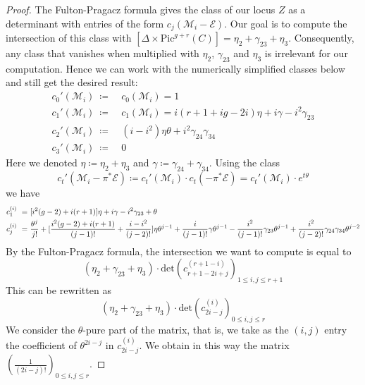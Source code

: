 \documentclass{article}
\theoremstyle{plain}
\theoremstyle{definition}
\def\cM{\mathcal{M}}
\begin{document}
\begin{proof}
The Fulton-Pragacz formula gives the class of our locus $Z$ as a determinant with entries of the form $c_j(\cM_i - \mathcal{E})$. Our goal is to compute the intersection of this class with $[\Delta\times \mathrm{Pic}^{g+r}(C)] = \eta_2 + \gamma_{23} +\eta_3$. Consequently, any class that vanishes when multiplied with $\eta_2$, $\gamma_{23}$ and $\eta_3$ is irrelevant for our computation. Hence we can work with the numerically simplified classes below and still get the desired result: 
\begin{align*}
	c_0'(\cM_i) \ \coloneqq & \ c_0(\cM_i) = 1 \\ 
	c_1'(\cM_i) \ \coloneqq & \ c_1(\cM_i) = i(r+1+ig-2i) \eta +i\gamma - i^2 \gamma_{23} \\
	c_2'(\cM_i) \ \coloneqq & \ (i-i^2)\eta\theta + i^2 \gamma_{24}\gamma_{34} \\ 
	c_3'(\cM_i) \ \coloneqq & \ 0
\end{align*} 
Here we denoted $\eta \coloneqq \eta_2 + \eta_3 $ and $\gamma \coloneqq \gamma_{24} + \gamma_{34}$. Using the class \[c_t'(\cM_i-\pi^*\mathcal{E}) \coloneqq c_t'(\cM_i) \cdot c_t(-\pi^*\mathcal{E}) = c_t'(\cM_i)\cdot e^{t\theta}\]
we have 
\begin{align*}
	c_1^{(i)} \ =& \ \text{\Large [}i^2(g-2) + i(r+1)\text{\Large ]}\eta + i\gamma - i^2\gamma_{23} + \theta \\ 
	c_j^{(i)} \ = & \ \frac{\theta^j}{j!} + \text{\LARGE [} \frac{i^2(g-2) + i(r+1)}{(j-1)!} + \frac{i-i^2}{(j-2)!} \text{\LARGE ]}\eta\theta^{j-1} + \frac{i}{(j-1)!}\gamma\theta^{j-1} - \frac{i^2}{(j-1)!}\gamma_{23}\theta^{j-1} + \frac{i^2}{(j-2)!}\gamma_{24}\gamma_{34}\theta^{j-2}
\end{align*}
By the Fulton-Pragacz formula, the intersection we want to compute is equal to 
\[ (\eta_2 + \gamma_{23} +\eta_3)\cdot \mathrm{det}(c^{(r+1-i)}_{r+1-2i+j})_{1\leq i,j\leq r+1}\]
This can be rewritten as  
\[(\eta_2 + \gamma_{23} +\eta_3)\cdot \mathrm{det}(c^{(i)}_{2i-j})_{0\leq i,j\leq r}\]
We consider the $\theta$-pure part of the matrix, that is, we take as the $(i,j)$ entry the coefficient of $\theta^{2i-j}$ in $c^{(i)}_{2i-j} $. We obtain in this way the matrix $(\frac{1}{(2i-j)!})_{0\leq i,j\leq r}$. 


\end{proof}
\end{document}
